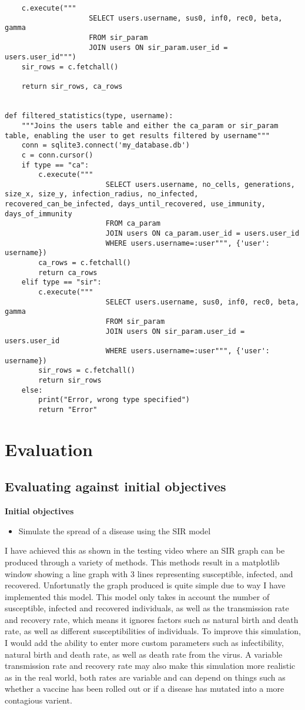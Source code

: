\documentclass[11pt, a4paper]{article}
\begin{document}
\begin{lstlisting}
    c.execute("""
                    SELECT users.username, sus0, inf0, rec0, beta, gamma
                    FROM sir_param
                    JOIN users ON sir_param.user_id = users.user_id""")
    sir_rows = c.fetchall()

    return sir_rows, ca_rows


def filtered_statistics(type, username):
    """Joins the users table and either the ca_param or sir_param table, enabling the user to get results filtered by username"""
    conn = sqlite3.connect('my_database.db')
    c = conn.cursor()
    if type == "ca":
        c.execute("""
                        SELECT users.username, no_cells, generations, size_x, size_y, infection_radius, no_infected, recovered_can_be_infected, days_until_recovered, use_immunity, days_of_immunity
                        FROM ca_param
                        JOIN users ON ca_param.user_id = users.user_id
                        WHERE users.username=:user""", {'user': username})
        ca_rows = c.fetchall()
        return ca_rows
    elif type == "sir":
        c.execute("""
                        SELECT users.username, sus0, inf0, rec0, beta, gamma
                        FROM sir_param
                        JOIN users ON sir_param.user_id = users.user_id
                        WHERE users.username=:user""", {'user': username})
        sir_rows = c.fetchall()
        return sir_rows
    else:
        print("Error, wrong type specified")
        return "Error"
\end{lstlisting}

\newpage
\section{Evaluation}
\subsection{Evaluating against initial objectives}
\textbf{Initial objectives}
\begin{itemize}
    \item Simulate the spread of a disease using the SIR model
\end{itemize}
I have achieved this as shown in the testing video where an SIR graph can be produced through a variety of methods. This methods result in a matplotlib window showing a line graph with 3 lines representing susceptible, infected, and recovered. Unfortunatly the graph produced is quite simple due to way I have implemented this model. This model only takes in account the number of susceptible, infected and recovered individuals, as well as the transmission rate and recovery rate, which means it ignores factors such as natural birth and death rate, as well as different susceptibilities of individuals. To improve this simulation, I would add the ability to enter more custom parameters such as infectibility, natural birth and death rate, as well as death rate from the virus. A variable transmission rate and recovery rate may also make this simulation more realistic as in the real world, both rates are variable and can depend on things such as  whether a vaccine has been rolled out or if a disease has mutated into a more contagious varient.
\end{document}
